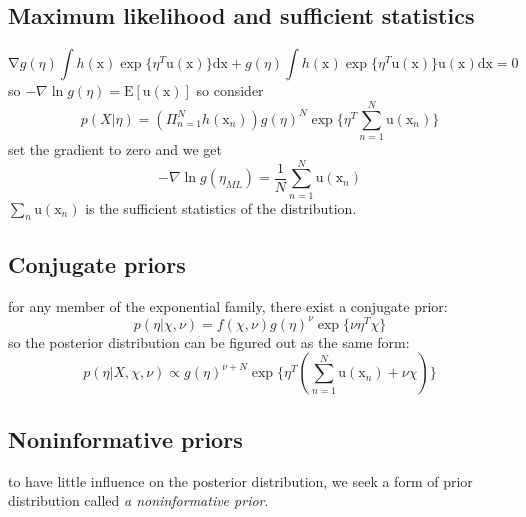 \documentclass[a4paper]{book}
\begin{document}
\subsection{Maximum likelihood and sufficient statistics}
\begin{equation}\label{1.4.3}
  \mathrm  \nabla g(\eta) \int h(\mathrm  x)\exp\{\eta^T\mathrm  u(\mathrm  x)\}\mathrm  {dx} +g(\eta)\int h(\mathrm  x)\exp\{\eta^T\mathrm u(\mathrm x)\} \mathrm u(\mathrm  x) \mathrm {dx} = 0
\end{equation}
so $-\nabla \ln g(\eta) = \mathrm E[\mathrm  u(\mathrm  x)] $\newline
so consider
$$p(X|\eta)  = (\Pi_{n=1}^Nh(\mathrm  x_n))g(\eta)^N\exp\{\eta^T\sum_{n=1}^N\mathrm  u(\mathrm  x_n) \}$$
set the gradient to zero and we get
\begin{equation}\label{1.4.4}
  -\nabla \ln g(\eta_{ML} ) = \frac1N\sum_{n=1}^N\mathrm  u(\mathrm  x_n)
\end{equation}
$\sum_n\mathrm  u(\mathrm  x_n)$ is the sufficient statistics of the distribution.
\subsection{Conjugate priors}
for any member of the exponential family, there exist a conjugate  prior:
$$p(\eta|\chi, \nu) = f(\chi,\nu)g(\eta)^\nu\exp\{\nu\eta^T\chi\}$$
so the posterior distribution can be figured out as the same form:
$$p(\eta|X,\chi,\nu) \propto g(\eta)^{\nu+N}\exp\{\eta^T(\sum_{n=1}^N\mathrm  u(\mathrm  x_n)+\nu\chi)\}$$
\subsection{Noninformative priors}
to have little influence on the posterior distribution, we seek a form of prior distribution called \emph{a noninformative prior}.
\end{document}
